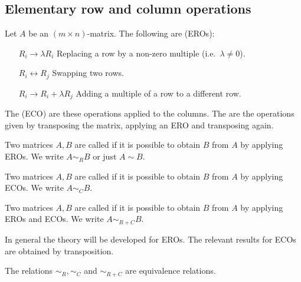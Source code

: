 \subsection{Elementary row and column operations}
\begin{definition}
Let $A$ be an $(m\times n)$-matrix. The following are  (EROs):
\begin{itemize}[leftmargin=3cm]
\item[$\boxed{R_i \to \lambda R_i}$] Replacing a row by a non-zero multiple (i.e.\ $\lambda \neq 0$).
\item[$\boxed{R_i \leftrightarrow R_j}$] Swapping two rows.
\item[$\boxed{R_i \to R_i+ \lambda R_j}$] Adding a multiple of a row to a different row.
\end{itemize}
The  (ECO) are these operations applied to the columns. The are the operations given by transposing the matrix, applying an ERO and transposing again.

Two matrices $A,B$ are called  if it is possible to obtain $B$ from $A$ by applying EROs. We write $A\sim_R B$ or just $A\sim B$.

Two matrices $A,B$ are called  if it is possible to obtain $B$ from $A$ by applying ECOs. We write $A\sim_C B$.

Two matrices $A,B$ are called  if it is possible to obtain $B$ from $A$ by applying EROs and ECOs. We write $A\sim_{R+C} B$.
\end{definition}
In general the theory will be developed for EROs. The relevant results for ECOs are obtained by transposition.

\begin{lemma}
The relations $\sim_R, \sim_C$ and $\sim_{R+C}$ are equivalence relations.
\end{lemma}

